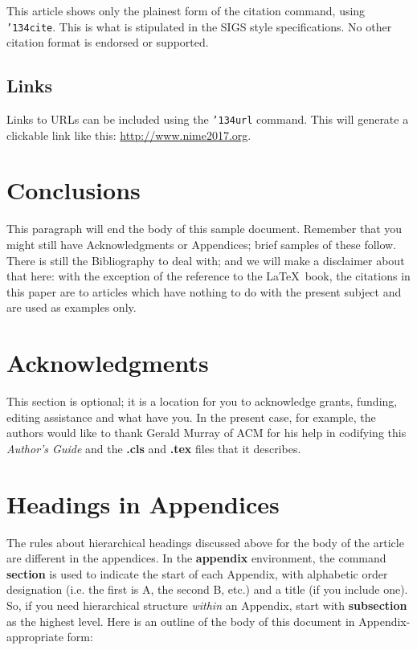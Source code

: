 \documentclass{nime-alternate}
\begin{document}
This article shows only the plainest form
of the citation command, using \texttt{{\char'134}cite}.
This is what is stipulated in the SIGS style specifications.
No other citation format is endorsed or supported.


\subsection{Links}

Links to URLs can be included using the \texttt{{\char'134}url} command. This will generate a clickable link like this: \url{http://www.nime2017.org}.


\section{Conclusions}
This paragraph will end the body of this sample document.
Remember that you might still have Acknowledgments or
Appendices; brief samples of these
follow.  There is still the Bibliography to deal with; and
we will make a disclaimer about that here: with the exception
of the reference to the \LaTeX\ book, the citations in
this paper are to articles which have nothing to
do with the present subject and are used as
examples only.

\section{Acknowledgments}
This section is optional; it is a location for you
to acknowledge grants, funding, editing assistance and
what have you.  In the present case, for example, the
authors would like to thank Gerald Murray of ACM for
his help in codifying this \textit{Author's Guide}
and the \textbf{.cls} and \textbf{.tex} files that it describes.

%

%
%
\appendix
\section{Headings in Appendices}
The rules about hierarchical headings discussed above for
the body of the article are different in the appendices.
In the \textbf{appendix} environment, the command
\textbf{section} is used to
indicate the start of each Appendix, with alphabetic order
designation (i.e. the first is A, the second B, etc.) and
a title (if you include one).  So, if you need
hierarchical structure
\textit{within} an Appendix, start with \textbf{subsection} as the
highest level. Here is an outline of the body of this
document in Appendix-appropriate form:
\end{document}
